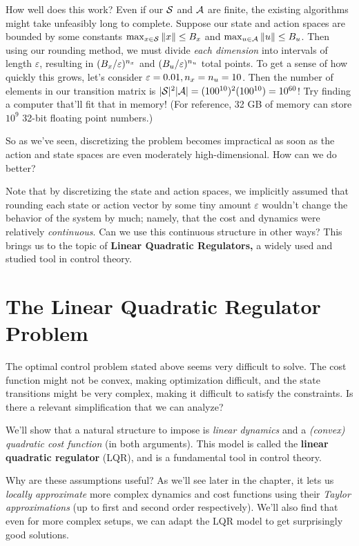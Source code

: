 \documentclass[../main/main]{subfiles}
\begin{document}
How well does this work? Even if our $\S$ and $\A$ are
finite, the existing algorithms might take unfeasibly long to complete.
Suppose our state and action spaces
are bounded by some constants $\max_{\st \in \S} \|\st\| \le B_\st$ and
$\max_{\act \in \A} \|\act\| \le B_\act$.
Then using our rounding method, we must divide \emph{each dimension} into intervals of length $\varepsilon$,
resulting in $(B_\st/\varepsilon)^{n_\st}$ and $(B_\act/\varepsilon)^{n_\act}$ total points.
To get a sense of how quickly this grows, let's consider $\varepsilon = 0.01, n_\st = n_\act = 10$. Then the number of elements in our transition matrix is $|\S|^2 |\A| = (100^{10})^2 (100^{10}) = 10^{60}$!
Try finding a computer that'll fit that in memory! (For reference, 32 GB of memory can store $10^9$ 32-bit floating point numbers.)

So as we've seen, discretizing the problem becomes impractical as soon as
the action and state spaces are even moderately high-dimensional.
How can we do better?

Note that by discretizing the state and action spaces, we implicitly assumed that rounding each state or action vector by some tiny amount $\varepsilon$
wouldn't change the behavior of the system by much;
namely, that the cost and dynamics were relatively \emph{continuous}.
Can we use this continuous structure in other ways? This brings us to the topic of \textbf{Linear Quadratic Regulators,} a widely used and studied tool in control theory.

\section{The Linear Quadratic Regulator Problem} \label{sec:lqr}

The optimal control problem stated above seems very difficult to solve.
The cost function might not be convex, making optimization difficult,
and the state transitions might be very complex, making it difficult to satisfy the constraints.
Is there a relevant simplification that we can analyze?

We'll show that a natural structure to impose is \emph{linear dynamics} and a \emph{(convex) quadratic cost function} (in both arguments). This model is called the \textbf{linear quadratic regulator} (LQR), and is a fundamental tool in control theory.

Why are these assumptions useful?
As we'll see later in the chapter,
it lets us \emph{locally approximate} more complex dynamics and cost functions using their \emph{Taylor approximations} (up to first and second order respectively).
We'll also find that even for more complex setups,
we can adapt the LQR model to get surprisingly good solutions.
\end{document}
